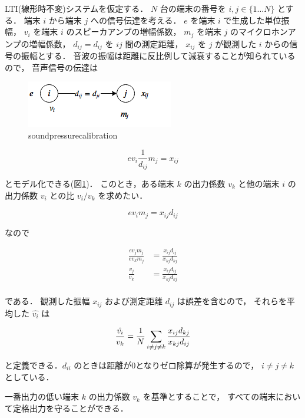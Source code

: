 LTI(線形時不変)システムを仮定する．
$N$ 台の端末の番号を $i,j \in \{1\dots N\}$ とする．
端末 $i$ から端末 $j$ への信号伝達を考える．
$e$ を端末 $i$ で生成した単位振幅，
$v_i$ を端末 $i$ のスピーカアンプの増幅係数，
$m_j$ を端末 $j$ のマイクロホンアンプの増幅係数，
$d_{ij}=d_{ij}$ を $ij$ 間の測定距離，
$x_{ij}$ を $j$ が観測した $i$ からの信号の振幅とする．
音波の振幅は距離に反比例して減衰することが知られているので，
音声信号の伝達は

\begin{figure}[tb]\centering
  \hspace{-2mm}\includegraphics[clip,width=1.1\hsize]{img/sound_pressure_calibration.png}
  \caption{soundpressurecalibration}\label{fig:soundpressurecalibration}
\end{figure}

$$
e v_i \frac{1}{d_{ij}} m_j = x_{ij}
$$

とモデル化できる(図\ref{fig:soundpressurecalibration})．
このとき，ある端末 $k$ の出力係数 $v_k$ と他の端末 $i$ の出力係数 $v_i$ との比 $v_i/v_k$ を求めたい．

$$
e v_i m_j = x_{ij}d_{ij}
$$

なので

$$\begin{aligned}
\frac{e v_j m_j}{e v_k m_j} &= \frac{x_{ij} d_{ij}}{x_{kj} d_{kj}} \\
\frac{v_j}{v_k} &= \frac{x_{ij} d_{ij}}{x_{kj}d_{kj}} \\
\end{aligned}$$

である．
観測した振幅 $x_{ij}$ および測定距離 $d_{ij}$ は誤差を含むので，
それらを平均した $\hat{v_i}$ は

$$
\frac{\hat{v_i}}{v_k} = \frac{1}{N} \sum_{i\neq j \neq k} \frac{x_{ij} d_{kj}}{x_{kj}d_{ij}} \\
$$

と定義できる．$d_{ii}$ のときは距離が0となりゼロ除算が発生するので，
$i\neq j \neq k$ としている．

一番出力の低い端末 $k$ の出力係数 $v_k$ を基準とすることで，
すべての端末において定格出力を守ることができる．

